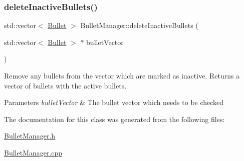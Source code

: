 \subsubsection{\texorpdfstring{delete\+Inactive\+Bullets()}{deleteInactiveBullets()}}
{\footnotesize\ttfamily std\+::vector$<$ \hyperlink{class_bullet}{Bullet} $>$ Bullet\+Manager\+::delete\+Inactive\+Bullets (\begin{DoxyParamCaption}\item[{std\+::vector$<$ \hyperlink{class_bullet}{Bullet} $>$ $\ast$}]{bullet\+Vector }\end{DoxyParamCaption})}



Remove any bullets from the vector which are marked as inactive. Returns a vector of bullets with the active bullets. 


\begin{DoxyParams}{Parameters}
{\em bullet\+Vector} & The bullet vector which needs to be checked \\
\hline
\end{DoxyParams}


The documentation for this class was generated from the following files\+:\begin{DoxyCompactItemize}
\item 
\hyperlink{_bullet_manager_8h}{Bullet\+Manager.\+h}\item 
\hyperlink{_bullet_manager_8cpp}{Bullet\+Manager.\+cpp}\end{DoxyCompactItemize}
